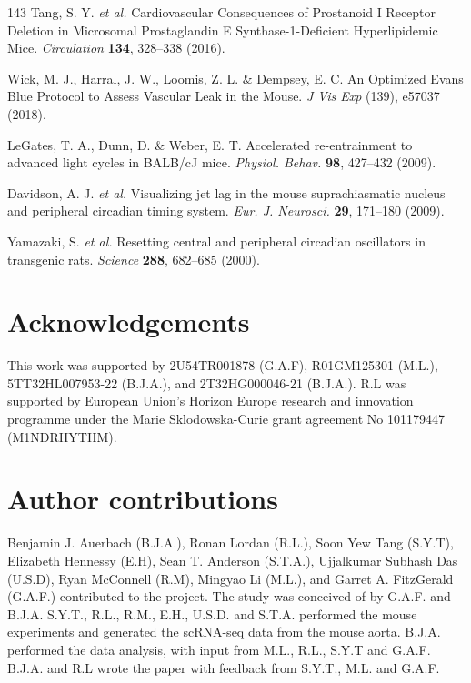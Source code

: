 \documentclass[12pt]{article}
\begin{document}
\begin{thebibliography}{143}
 Tang, S. Y. \textit{et al.} Cardiovascular Consequences of Prostanoid I Receptor Deletion in Microsomal Prostaglandin E Synthase-1-Deficient Hyperlipidemic Mice. \textit{Circulation} \textbf{134}, 328--338 (2016).

 Wick, M. J., Harral, J. W., Loomis, Z. L. \& Dempsey, E. C. An Optimized Evans Blue Protocol to Assess Vascular Leak in the Mouse. \textit{J Vis Exp} (139), e57037 (2018).

 LeGates, T. A., Dunn, D. \& Weber, E. T. Accelerated re-entrainment to advanced light cycles in BALB/cJ mice. \textit{Physiol. Behav.} \textbf{98}, 427--432 (2009).

 Davidson, A. J. \textit{et al.} Visualizing jet lag in the mouse suprachiasmatic nucleus and peripheral circadian timing system. \textit{Eur. J. Neurosci.} \textbf{29}, 171--180 (2009).

 Yamazaki, S. \textit{et al.} Resetting central and peripheral circadian oscillators in transgenic rats. \textit{Science} \textbf{288}, 682--685 (2000).
\end{thebibliography}

\section*{Acknowledgements}

This work was supported by 2U54TR001878 (G.A.F), R01GM125301 (M.L.), 5TT32HL007953-22 (B.J.A.), and
2T32HG000046-21 (B.J.A.). R.L was supported by European Union’s Horizon Europe research and innovation programme under the Marie Sklodowska-Curie grant agreement No 101179447 (M1NDRHYTHM). 

\section*{Author contributions}

Benjamin J. Auerbach (B.J.A.), Ronan Lordan (R.L.), Soon Yew Tang (S.Y.T), Elizabeth Hennessy (E.H), Sean T. Anderson
(S.T.A.), Ujjalkumar Subhash Das (U.S.D), Ryan McConnell (R.M), Mingyao Li (M.L.), and Garret A. FitzGerald (G.A.F.) contributed to the project. The study
was conceived of by G.A.F. and B.J.A. S.Y.T., R.L., R.M., E.H., U.S.D. and S.T.A. performed the mouse experiments and
generated the scRNA-seq data from the mouse aorta. B.J.A. performed the data analysis, with input
from M.L., R.L., S.Y.T and G.A.F. B.J.A. and R.L wrote the paper with feedback from S.Y.T., M.L. and G.A.F.
\end{document}
